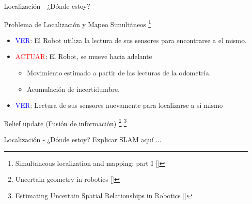 \documentclass[
  24pt, %
  aspectratio=169, %
]{beamer}
\begin{document}
\begin{frame}{Localización - ¿Dónde estoy?}

  Problema de Localización y Mapeo Simultáneos  \footnote{Simultaneous localization and mapping: part I [\cite{slam_doc}]}
  \bigskip %
  \begin{itemize} 
    \item \textcolor{blue}{VER}: El Robot utiliza la lectura de sus sensores para encontrarse a el mismo.
      \bigskip %
    \item \textcolor{red}{ACTUAR}: El Robot, se mueve hacia adelante
      \begin{itemize}
      \item Movimiento estimado a partir de las lecturas de la odometría.
      \item Acumulación de incertidumbre.
      \end{itemize}
      \bigskip %
    \item \textcolor{blue}{VER}: Lectura de sus sensores nuevamente para localizarse a sí mismo
  \end{itemize}
      
  \bigskip %
  Belief update (Fusión de información) \footnote{Uncertain geometry in robotics [\cite{slam_dur}]} \footnote{Estimating Uncertain Spatial Relationships in Robotics [\cite{Smith1988}]}
  
\end{frame}

\begin{frame}{Localización - ¿Dónde estoy?}
Explicar SLAM aquí ...
\end{frame}
\end{document}
